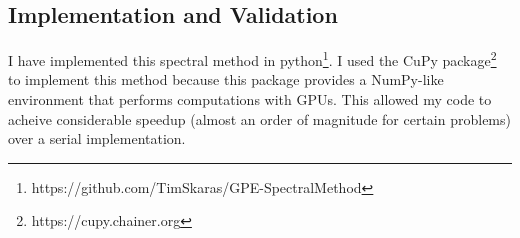 \documentclass[12]{article}
\begin{document}
\subsection{Implementation and Validation}

I have implemented this spectral method in python\footnote{https://github.com/TimSkaras/GPE-SpectralMethod}. I used the CuPy package\footnote{https://cupy.chainer.org} to implement this method because this package provides a NumPy-like environment that performs computations with GPUs. This allowed my code to acheive considerable speedup (almost an order of magnitude for certain problems) over a serial implementation.



\end{document}
